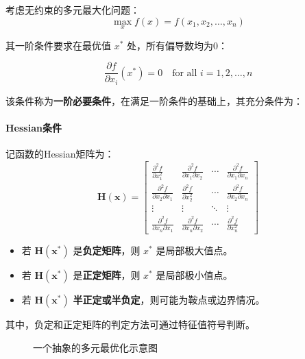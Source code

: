 考虑无约束的多元最大化问题：
\begin{equation}
	\max_x f(x) = f(x_1, x_2, \ldots, x_n)
\end{equation}

\noindent 其一阶条件要求在最优值 $x^*$ 处，所有偏导数均为0：

\begin{equation}
	\frac{\partial f}{\partial x_i}(x^*) = 0 \quad \text{for all } i = 1, 2, \ldots, n
\end{equation}

\noindent 该条件称为\textbf{一阶必要条件}，在满足一阶条件的基础上，其充分条件为：

\paragraph*{Hessian条件}

记函数的Hessian矩阵为：
\begin{equation}
	\mathbf{H(x)} = \begin{bmatrix}
		\frac{\partial^2 f}{\partial x_1^2} & \frac{\partial^2 f}{\partial x_1 \partial x_2} & \cdots & \frac{\partial^2 f}{\partial x_1 \partial x_n} \\
		\frac{\partial^2 f}{\partial x_2 \partial x_1} & \frac{\partial^2 f}{\partial x_2^2} & \cdots & \frac{\partial^2 f}{\partial x_2 \partial x_n} \\
		\vdots & \vdots & \ddots & \vdots \\
		\frac{\partial^2 f}{\partial x_n \partial x_1} & \frac{\partial^2 f}{\partial x_n \partial x_2} & \cdots & \frac{\partial^2 f}{\partial x_n^2}
	\end{bmatrix}
\end{equation}

\begin{itemize}
	\item 若 $\mathbf{H(x^*)}$ 是\textbf{负定矩阵}，则 $x^*$ 是局部极大值点。
	\item 若 $\mathbf{H(x^*)}$ 是\textbf{正定矩阵}，则 $x^*$ 是局部极小值点。
	\item 若 $\mathbf{H(x^*)}$ \textbf{半正定或半负定}，则可能为鞍点或边界情况。
\end{itemize}
\vspace{0.8em} %

\noindent 其中，负定和正定矩阵的判定方法可通过特征值符号判断。

\begin{figure}[ht]
	\centering
	\caption{一个抽象的多元最优化示意图}
\end{figure}

